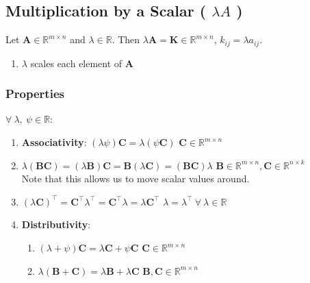 \subsection{Multiplication by a Scalar ( $\lambda A$ )}

Let $\bm{A} \in \mathbb{R}^{m\times n}$ and $\lambda \in \mathbb{R}$. 
Then $\lambda \bm{A} = \bm{K} \in \mathbb{R}^{m\times n}$, $k_{ij} = \lambda a_{ij}$.
\hfill \cite{mfml/book/mml/Deisenroth-Faisal-Ong}


\begin{enumerate}
    \item $\lambda$ scales each element of $\bm{A}$
    \hfill \cite{mfml/book/mml/Deisenroth-Faisal-Ong}    
\end{enumerate}





\subsubsection{Properties}

$\forall\ \lambda,\ \psi \in \mathbb{R}$:
\vspace{0.2cm}
\begin{enumerate}
    \item \textbf{Associativity}:
    $(\lambda \psi )\bm{C} = \lambda (\psi \bm{C})$ \hfill $\bm{C} \in  \mathbb{R}^{m\times n}$
    \hfill \cite{mfml/book/mml/Deisenroth-Faisal-Ong}
    
    \item $
        \lambda (\bm{BC}) 
        = (\lambda \bm{B})\bm{C} 
        = \bm{B}(\lambda \bm{C}) 
        = (\bm{BC})\lambda 
        $ 
    \hfill $\bm{B} \in  \mathbb{R}^{m\times n}, \bm{C} \in  \mathbb{R}^{n\times k}$
    \hfill \cite{mfml/book/mml/Deisenroth-Faisal-Ong}
    \\
    Note that this allows us to move scalar values around.
    \hfill \cite{mfml/book/mml/Deisenroth-Faisal-Ong}

    \item $
        (\lambda \bm{C}) ^\top  
        = \bm{C}^\top \lambda ^\top  
        = \bm{C}^\top \lambda  
        = \lambda \bm{C}^\top 
    $
    \hfill $\lambda  = \lambda ^\top \  \forall \ \lambda  \in  \mathbb{R}$
    \hfill \cite{mfml/book/mml/Deisenroth-Faisal-Ong}

    \item \textbf{Distributivity}:
    \begin{enumerate}
        \item $(\lambda  + \psi )\bm{C} = \lambda \bm{C} + \psi \bm{C}$
        \hfill $\bm{C} \in  \mathbb{R}^{m\times n}$
        \hfill \cite{mfml/book/mml/Deisenroth-Faisal-Ong}

        \item $\lambda (\bm{B} + \bm{C}) = \lambda \bm{B} + \lambda \bm{C}$
        \hfill $\bm{B}, \bm{C} \in  \mathbb{R}^{m\times n}$
        \hfill \cite{mfml/book/mml/Deisenroth-Faisal-Ong}        
    \end{enumerate}
\end{enumerate}


